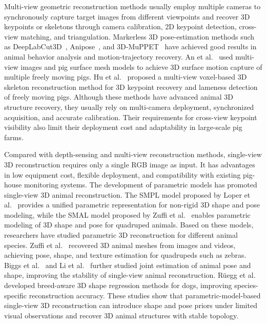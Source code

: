 \documentclass[runningheads]{llncs}
\begin{document}
Multi-view geometric reconstruction methods usually employ multiple cameras to synchronously capture target images from different viewpoints and recover 3D keypoints or skeletons through camera calibration, 2D keypoint detection, cross-view matching, and triangulation. Markerless 3D pose-estimation methods such as DeepLabCut3D~\cite{ref15}, Anipose~\cite{ref16}, and 3D-MuPPET~\cite{ref17} have achieved good results in animal behavior analysis and motion-trajectory recovery. An et al.~\cite{ref18} used multi-view images and pig surface mesh models to achieve 3D surface motion capture of multiple freely moving pigs. Hu et al.~\cite{ref6} proposed a multi-view voxel-based 3D skeleton reconstruction method for 3D keypoint recovery and lameness detection of freely moving pigs. Although these methods have advanced animal 3D structure recovery, they usually rely on multi-camera deployment, synchronized acquisition, and accurate calibration. Their requirements for cross-view keypoint visibility also limit their deployment cost and adaptability in large-scale pig farms.

Compared with depth-sensing and multi-view reconstruction methods, single-view 3D reconstruction requires only a single RGB image as input. It has advantages in low equipment cost, flexible deployment, and compatibility with existing pig-house monitoring systems. The development of parametric models has promoted single-view 3D animal reconstruction. The SMPL model proposed by Loper et al.~\cite{ref19} provides a unified parametric representation for non-rigid 3D shape and pose modeling, while the SMAL model proposed by Zuffi et al.~\cite{ref20} enables parametric modeling of 3D shape and pose for quadruped animals. Based on these models, researchers have studied parametric 3D reconstruction for different animal species. Zuffi et al.~\cite{ref21,ref22} recovered 3D animal meshes from images and videos, achieving pose, shape, and texture estimation for quadrupeds such as zebras. Biggs et al.~\cite{ref23} and Li et al.~\cite{ref24} further studied joint estimation of animal pose and shape, improving the stability of single-view animal reconstruction. Rüegg et al.~\cite{ref25,ref26} developed breed-aware 3D shape regression methods for dogs, improving species-specific reconstruction accuracy. These studies show that parametric-model-based single-view 3D reconstruction can introduce shape and pose priors under limited visual observations and recover 3D animal structures with stable topology.
\end{document}
